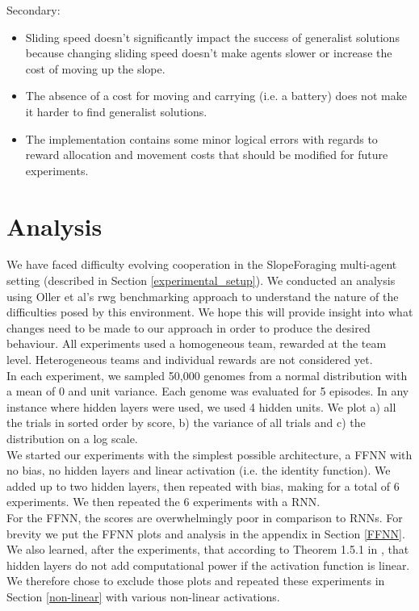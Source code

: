 \documentclass[12pt]{article}
\begin{document}
Secondary:
\begin{itemize}
\item Sliding speed doesn't significantly impact the success of generalist solutions because changing sliding speed doesn't make agents slower or increase the cost of moving up the slope.

\item The absence of a cost for moving and carrying (i.e. a battery) does not make it harder to find generalist solutions.

\item The implementation contains some minor logical errors with regards to reward allocation and movement costs that should be modified for future experiments.
\end{itemize}

\section{Analysis}
		
We have faced difficulty evolving cooperation in the SlopeForaging multi-agent setting (described in Section \ref{experimental_setup}). 
We conducted an analysis using Oller et al's rwg benchmarking approach \cite{oller:AAMAS:2020} to understand the nature of the difficulties posed by this environment. 
We hope this will provide insight into what changes need to be made to our approach in order to produce the desired behaviour. 
All experiments used a homogeneous team, rewarded at the team level. 
Heterogeneous teams and individual rewards are not considered yet.\\

In each experiment, we sampled 50,000 genomes from a normal distribution with a mean of 0 and unit variance. 
Each genome was evaluated for 5 episodes. 
In any instance where hidden layers were used, we used 4 hidden units. 
We plot a) all the trials in sorted order by score, b) the variance of all trials and c) the distribution on a log scale.\\

We started our experiments with the simplest possible architecture, a FFNN with no bias, no hidden layers and linear activation (i.e. the identity function). 
We added up to two hidden layers, then repeated with bias, making for a total of 6 experiments. 
We then repeated the 6 experiments with a RNN. \\

For the FFNN, the scores are overwhelmingly poor in comparison to RNNs. 
For brevity we put the FFNN plots and analysis in the appendix in Section \ref{FFNN}. 
We also learned, after the experiments, that according to Theorem 1.5.1 in \cite{aggarwal:Springer:2018}, that hidden layers do not add computational power if the activation function is linear. 
We therefore chose to exclude those plots and repeated these experiments in Section \ref{non-linear} with various non-linear activations.\\
\end{document}
